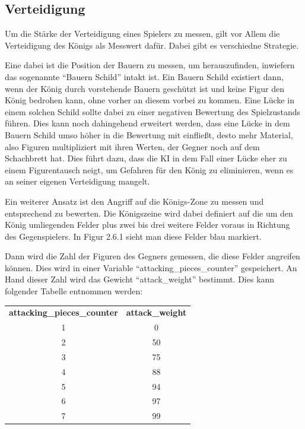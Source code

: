 
\subsection{Verteidigung}

Um die Stärke der Verteidigung eines Spielers zu messen, gilt vor Allem die Verteidigung des Königs als Messwert dafür. Dabei gibt es verschiedne Strategie.

Eine dabei ist die Position der Bauern zu messen, um herauszufinden, inwiefern das sogenannte ``Bauern Schild'' intakt ist. Ein Bauern Schild existiert dann, wenn der König durch vorstehende Bauern geschützt ist und keine Figur den König bedrohen kann, ohne vorher an diesem vorbei zu kommen. Eine Lücke in einem solchen Schild sollte dabei zu einer negativen Bewertung des Spielzustands führen. Dies kann noch dahingehend erweitert werden, dass eine Lücke in dem Bauern Schild umso höher in die Bewertung mit einfließt, desto mehr Material, also Figuren multipliziert mit ihren Werten, der Gegner noch auf dem Schachbrett hat. Dies führt dazu, dass die KI in dem Fall einer Lücke eher zu einem Figurentausch neigt, um Gefahren für den König zu eliminieren, wenn es an seiner eigenen Verteidigung mangelt.

Ein weiterer Ansatz ist den Angriff auf die Königs-Zone zu messen und entsprechend zu bewerten. Die Königszeine wird dabei definiert auf die um den König umliegenden Felder plus zwei bis drei weitere Felder voraus in Richtung des Gegenspielers. In Figur 2.6.1 sieht man diese Felder blau markiert.


Dann wird die Zahl der Figuren des Gegners gemessen, die diese Felder angreifen können. Dies wird in einer Variable ``attacking\_pieces\_counter'' gespeichert. An Hand dieser Zahl wird das Gewicht ``attack\_weight'' bestimmt. Dies kann folgender Tabelle entnommen werden:

\begin{tabular}{c c}
\textbf{attacking\_pieces\_counter} & \textbf{attack\_weight}\\
1 & 0\\
2 & 50\\
3 & 75\\
4 & 88\\
5 & 94\\
6 & 97\\
7 & 99
\end{tabular}

